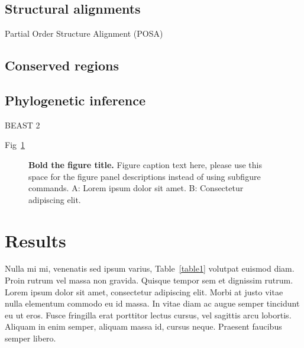 \documentclass[10pt,letterpaper]{article}
\begin{document}
\subsection*{Structural alignments}


Partial Order Structure Alignment (POSA)


\subsection*{Conserved regions}


\subsection*{Phylogenetic inference}
BEAST 2

 Fig~\ref{fig1}   

\begin{figure}[!h]
\caption{{\bf Bold the figure title.}
Figure caption text here, please use this space for the figure panel descriptions instead of using subfigure commands. A: Lorem ipsum dolor sit amet. B: Consectetur adipiscing elit.}
\label{fig1}
\end{figure}

\section*{Results}
Nulla mi mi, venenatis sed ipsum varius, Table~\ref{table1} volutpat euismod diam. Proin rutrum vel massa non gravida. Quisque tempor sem et dignissim rutrum. Lorem ipsum dolor sit amet, consectetur adipiscing elit. Morbi at justo vitae nulla elementum commodo eu id massa. In vitae diam ac augue semper tincidunt eu ut eros. Fusce fringilla erat porttitor lectus cursus, vel sagittis arcu lobortis. Aliquam in enim semper, aliquam massa id, cursus neque. Praesent faucibus semper libero.
\end{document}

